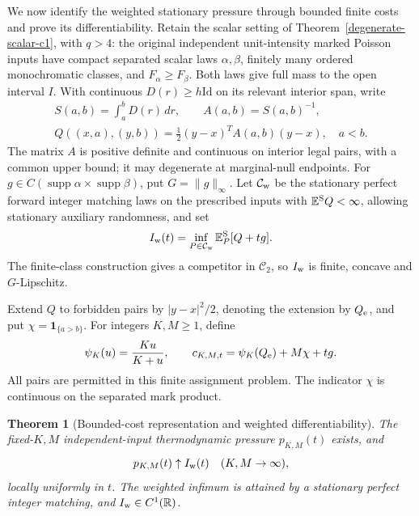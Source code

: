 \documentclass[11pt,reqno]{amsart}
\newtheorem{theorem}{Theorem}[section]
\theoremstyle{definition}
\theoremstyle{remark}
\numberwithin{equation}{section}
\newcommand{\R}{\mathbb R}
\newcommand{\E}{\mathbb E}
\begin{document}
We now identify the weighted stationary pressure through bounded finite
costs and prove its differentiability. Retain the scalar setting of
Theorem~\ref{degenerate-scalar-c1}, with \(q>4\): the original
independent unit-intensity marked Poisson inputs have compact separated
scalar laws \(\alpha,\beta\), finitely many ordered monochromatic
classes, and \(F_\alpha\ge F_\beta\). Both laws give full mass to
the open interval \(I\). With continuous \(D(r)\ge h\mathrm{Id}\)
on its relevant interior span, write
\[
 \begin{gathered}
 S(a,b)=\int_a^bD(r)\,dr,\qquad A(a,b)=S(a,b)^{-1},\\
 Q((x,a),(y,b))=\tfrac12(y-x)^TA(a,b)(y-x),\quad a<b.
 \end{gathered}
\]
The matrix \(A\) is positive definite and continuous on interior
legal pairs, with a common upper bound; it may degenerate at
marginal-null endpoints. For
\(g\in C(\operatorname{supp}\alpha\times\operatorname{supp}\beta)\),
put \(G=\|g\|_\infty\). Let \(\mathcal C_{\rm w}\) be the stationary
perfect forward integer matching laws on the prescribed inputs with
\(\E^{\rm S}Q<\infty\), allowing stationary auxiliary randomness, and set
\begin{equation}
\label{weighted-capped-pressure-definition}
 I_{\rm w}(t)=\inf_{P\in\mathcal C_{\rm w}}
                           \E_P^{\rm S}[Q+tg].
\end{equation}
The finite-class construction gives a competitor in \(\mathcal C_2\),
so \(I_{\rm w}\) is finite, concave and \(G\)-Lipschitz.

Extend \(Q\) to forbidden pairs by \(|y-x|^2/2\), denoting the
extension by \(Q_{\rm e}\), and put \(\chi=\mathbf1_{\{a>b\}}\).
For integers \(K,M\ge1\), define
\begin{equation}
\label{weighted-capped-cost}
 \psi_K(u)=\frac{Ku}{K+u},\qquad
 c_{K,M,t}=\psi_K(Q_{\rm e})+M\chi+tg.
\end{equation}
All pairs are permitted in this finite assignment problem. The indicator
\(\chi\) is continuous on the separated mark product.

\begin{theorem}[Bounded-cost representation and weighted differentiability]
\label{weighted-capped-c1}
The fixed-\(K,M\) independent-input thermodynamic pressure
\(p_{K,M}(t)\) exists, and
\begin{equation}
\label{weighted-capped-value-limit}
                   p_{K,M}(t)\uparrow I_{\rm w}(t)
                   \quad(K,M\to\infty),
\end{equation}
locally uniformly in \(t\). The weighted infimum is attained by a
stationary perfect integer matching, and \(I_{\rm w}\in C^1(\R)\).
\end{theorem}
\end{document}
